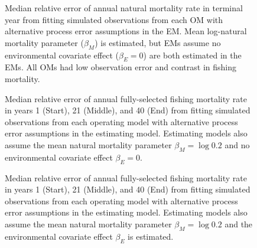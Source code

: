 \documentclass[
  12pt,
]{article}
\begin{document}
\begin{landscape}
\begin{figure}
\caption{Median relative error of annual natural mortality rate in terminal year from fitting simulated observations from each OM with alternative process error assumptions in the EM. Mean log-natural mortality parameter ($\beta_M$) is estimated, but EMs assume no environmental covariate effect ($\beta_E = 0 $) are both estimated in the EMs. All OMs had low observation error and contrast in fishing mortality.}\label{terminal_M_bias_beta_0}
\begin{center}
\end{center}
\end{figure}
\end{landscape}

\begin{landscape}
\begin{figure}
\caption{Median relative error of annual fully-selected fishing mortality rate in years 1 (Start), 21 (Middle), and 40 (End) from fitting simulated observations from each operating model with alternative process error assumptions in the estimating model. Estimating models also assume the mean natural mortality parameter $\beta_M = \log 0.2$ and no environmental covariate effect $\beta_E = 0$.}\label{F_bias_M_fixed_beta_fixed}
\begin{center}
\end{center}
\end{figure}
\end{landscape}

\begin{landscape}
\begin{figure}
\caption{Median relative error of annual fully-selected fishing mortality rate in years 1 (Start), 21 (Middle), and 40 (End) from fitting simulated observations from each operating model with alternative process error assumptions in the estimating model. Estimating models also assume the mean natural mortality parameter $\beta_M = \log 0.2$ and the environmental covariate effect $\beta_E$ is estimated.}\label{F_bias_M_fixed_beta_estimated}
\begin{center}
\end{center}
\end{figure}
\end{landscape}
\end{document}
